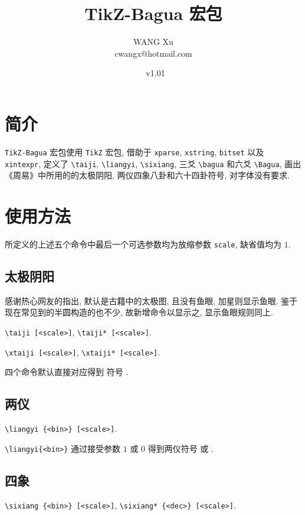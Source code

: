 \documentclass{article}
\title{TikZ-Bagua 宏包}
\author{WANG Xu \\ cwangx@hotmail.com}
\date{\zhtoday~v1.01}
\begin{document}
\maketitle

\section{简介}

\verb+TikZ-Bagua+ 宏包使用 \verb+TikZ+ 宏包, 借助于 \verb+xparse+, \verb+xstring+, \verb+bitset+ 以及 \verb+xintexpr+, 定义了 \verb+\taiji+, \verb+\liangyi+, \verb+\sixiang+, 三爻 \verb+\bagua+ 和六爻 \verb+\Bagua+,  画出《周易》中所用的的太极阴阳, 两仪四象八卦和六十四卦符号, 对字体没有要求.

\section{使用方法}

所定义的上述五个命令中最后一个可选参数均为放缩参数 \verb|scale|, 缺省值均为 $1$.

\subsection{太极阴阳}

感谢热心网友的指出, 默认是古籍中的太极图, 且没有鱼眼, 加星则显示鱼眼. 鉴于现在常见到的半圆构造的也不少, 故新增命令以显示之, 显示鱼眼规则同上. 

\verb+\taiji [<scale>]+, \verb+\taiji* [<scale>]+.

\verb+\xtaiji [<scale>]+, \verb+\xtaiji* [<scale>]+.

四个命令默认直接对应得到 符号 \taiji \taiji* \xtaiji \xtaiji*.

\subsection{两仪}
\verb+\liangyi {<bin>} [<scale>]+.

\verb+\liangyi{<bin>}+ 通过接受参数 $1$ 或 $0$ 得到两仪符号  或 .

\subsection{四象}
\verb+\sixiang {<bin>} [<scale>]+, \verb+\sixiang* {<dec>} [<scale>]+.
\end{document}
